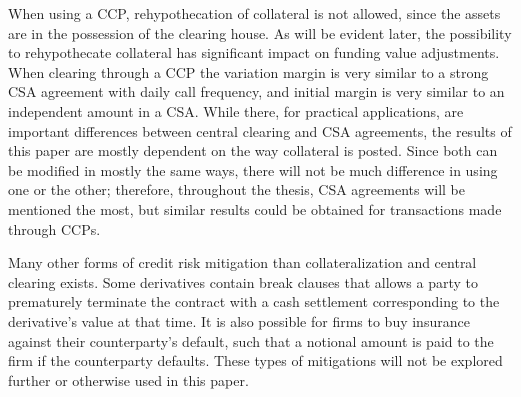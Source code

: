 \documentclass[main.tex]{subfiles}
\begin{document}
        When using a CCP, rehypothecation of collateral is not allowed,
        since the assets are in the possession of the clearing house.
        As will be evident later, the possibility to rehypothecate collateral
        has significant impact on funding value adjustments.
        When clearing through a CCP the variation margin is very similar 
        to a strong CSA agreement with daily call frequency, 
        and initial margin is very similar to an independent amount in a CSA.
        While there, for practical applications, 
        are important differences between central clearing and CSA agreements,
        the results of this paper are mostly dependent on the way collateral is posted.
        Since both can be modified in mostly the same ways,
        there will not be much difference in using one or the other;
        therefore, throughout the thesis, CSA agreements will be mentioned the most, 
        but similar results could be obtained for transactions made through CCPs.

    Many other forms of credit risk mitigation than collateralization and central clearing exists. 
    Some derivatives contain break clauses that allows a party to prematurely terminate the 
    contract with a cash settlement corresponding to the derivative's value at that time.
    It is also possible for firms to buy insurance against their counterparty's default,
    such that a notional amount is paid to the firm if the counterparty defaults.
    These types of mitigations will not be explored further or otherwise used in this paper.
\end{document}
